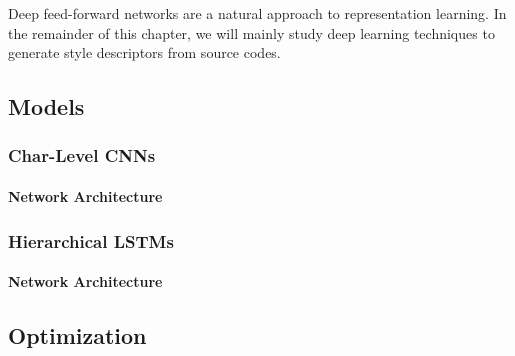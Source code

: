 
Deep feed-forward networks are a natural approach to representation learning. In the remainder of this chapter, we will mainly study deep learning techniques to generate style descriptors from source codes.

\subsection{Models}\label{sec:models}
\subsubsection{Char-Level CNNs}
\paragraph*{Network Architecture}
\subsubsection{Hierarchical LSTMs}
\paragraph*{Network Architecture}
\subsection{Optimization}\label{sec:optimization}